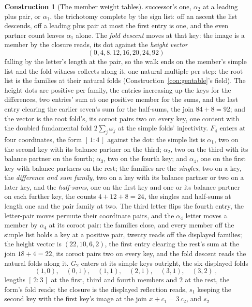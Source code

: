 \documentclass[11pt]{article}
\theoremstyle{definition}
\newtheorem{construction}{Construction}
\begin{document}
\begin{construction}[The member weight tables]
successor's one, $\alpha_2$ at a leading plus pair, or
$\alpha_1$, the trichotomy complete by the sign list: off an
ascent the list descends, off a leading plus pair at most the
first entry is one, and the even partner count leaves $\alpha_1$
alone. The \emph{fold descent} moves at that key: the image is a
member by the closure reads, its dot against the \emph{height
vector}
\[
(0,4,8,12,16,20,24,92)
\]
falling by the letter's length at the pair, so the walk ends on
the member's simple list and the fold witness collects along it,
one natural multiple per step: the root list is the families at
their natural folds (Construction~\ref{con:gentable}'s field).
The height dots are positive per family, the entries increasing
up the keys for the differences, two entries' sum at one
positive member for the sums, and the last entry clearing the
earlier seven's sum for the half-sums, the join $84+8=92$; and
the vector is the root fold's, its coroot pairs two on every
key, one content with the doubled fundamental fold
$2\sum_j\omega_j$ at the simple folds' injectivity. $F_4$ enters
at four coordinates, the form $[\,1:4\,]$ against the dot: the
simple list is $\alpha_1$, two on the second key with its
balance partner on the third; $\alpha_2$, two on the third with
its balance partner on the fourth; $\alpha_3$, two on the fourth
key; and $\alpha_4$, one on the first key with balance partners
on the rest; the families are the \emph{singles}, two on a key,
the \emph{difference and sum family}, two on a key with its
balance partner or two on a later key, and the \emph{half-sums},
one on the first key and one or its balance partner on each
further key, the counts $4+12+8=24$, the singles and half-sums
at length one and the pair family at two. The third letter
flips the fourth entry, the letter-pair moves permute their
coordinate pairs, and the $\alpha_4$ letter moves a member by
$\alpha_4$ at its coroot pair: the families close, and every
member off the simple list holds a key at a positive pair,
twenty reads off the displayed families; the height vector is
$(22,10,6,2)$, the first entry clearing the rest's sum at the
join $18+4=22$, its coroot pairs two on every key, and the fold
descent reads the natural folds along it. $G_2$ enters at its
simple keys outright, the six displayed folds
\[
(1,0),\quad(0,1),\quad(1,1),\quad(2,1),\quad(3,1),\quad(3,2)\ ,
\]
lengths $[\,2:3\,]$ at the first, third and fourth members and
$2$ at the rest, the form's fold reads; the closure is the
displayed reflection reads, $s_1$ keeping the second key with
the first key's image at the join $x+c_1=3\,c_2$, and $s_2$

\end{construction}
\end{document}
